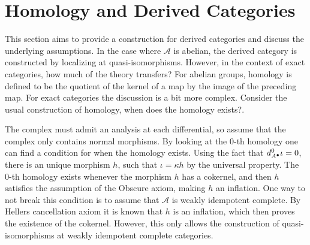 \section{Homology and Derived Categories}

    This section aims to provide a construction for derived categories and discuss the underlying assumptions. In the case where $\mathcal{A}$ is abelian, the derived category is constructed by localizing at quasi-isomorphisms. However, in the context of exact categories, how much of the theory transfers? For abelian groups, homology is defined to be the quotient of the kernel of a map by the image of the preceding map. For exact categories the discussion is a bit more complex. Consider the usual construction of homology, when does the homology exists?.

    \begin{center}
    \end{center}

    The complex must admit an analysis at each differential, so assume that the complex only contains normal morphisms. By looking at the 0-th homology one can find a condition for when the homology exists. Using the fact that $d^0_{A^{\bullet}}\iota = 0$, there is an unique morphism $h$, such that $\iota = \kappa h$ by the universal property. The 0-th homology exists whenever the morphism $h$ has a cokernel, and then $h$ satisfies the assumption of the Obscure axiom, making $h$ an inflation. One way to not break this condition is to assume that $\mathcal{A}$ is weakly idempotent complete. By Hellers cancellation axiom it is known that $h$ is an inflation, which then proves the existence of the cokernel. However, this only allows the construction of quasi-isomorphisms at weakly idempotent complete categories. \\
    
